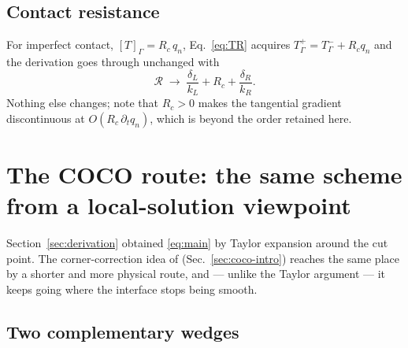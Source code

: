 \documentclass[11pt,a4paper]{article}
\newcommand{\jump}[1]{\left[#1\right]}
\newcommand{\Rser}{\mathcal{R}}
\begin{document}
\subsection{Contact resistance}
\label{sec:contact}

For imperfect contact, $\jump{T}_\Gamma = R_c\,q_n$, Eq.~\eqref{eq:TR} acquires
$T_\Gamma^{+}=T_\Gamma^{-}+R_c q_n$ and the derivation goes through unchanged
with
\begin{equation}
  \Rser \;\longrightarrow\; \frac{\delta_L}{k_L}+R_c+\frac{\delta_R}{k_R}.
\end{equation}
Nothing else changes; note that $R_c>0$ makes the tangential gradient
discontinuous at $O(R_c\,\partial_t q_n)$, which is beyond the order retained here.

\section{The COCO route: the same scheme from a local-solution viewpoint}
\label{sec:coco}

Section~\ref{sec:derivation} obtained \eqref{eq:main} by Taylor expansion around
the cut point. The corner-correction idea of \cite{cipelli2025}
(Sec.~\ref{sec:coco-intro}) reaches the same place by a shorter and more
physical route, and --- unlike the Taylor argument --- it keeps going where the
interface stops being smooth.

\subsection{Two complementary wedges}
\label{sec:wedges}
\end{document}
